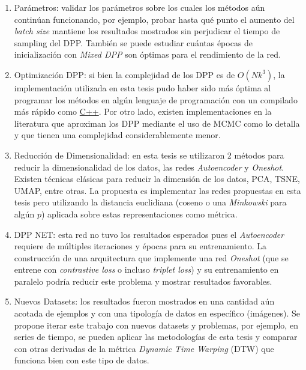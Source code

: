 \begin{enumerate}

    \item Parámetros: validar los parámetros sobre los cuales los métodos aún continúan funcionando, por ejemplo, probar hasta qué punto el aumento del \textit{batch size} mantiene los resultados mostrados sin perjudicar el tiempo de sampling del DPP. También se puede estudiar cuántas épocas de inicialización con \textit{Mixed DPP} son óptimas para el rendimiento de la red. 
    
    \item Optimización DPP: si bien la complejidad de los DPP es de $O(Nk^3)$, la implementación utilizada en esta tesis pudo haber sido más óptima al programar los métodos en algún lenguaje de programación con un compilado más rápido como \href{https://es.wikipedia.org/wiki/C\%2B\%2B}{C++}. Por otro lado, existen implementaciones en la literatura que aproximan los DPP mediante el uso de MCMC como lo detalla \cite{https://doi.org/10.48550/arxiv.1602.05242} y que tienen una complejidad considerablemente menor.
    
    \item Reducción de Dimensionalidad: en esta tesis se utilizaron 2 métodos para reducir la dimensionalidad de los datos, las redes \textit{Autoencoder} y \textit{Oneshot}. Existen técnicas clásicas para reducir la dimensión de los datos, PCA, TSNE, UMAP, entre otras. La propuesta es implementar las redes propuestas en esta tesis pero utilizando la distancia euclidiana (coseno o una \textit{Minkowski} para algún $p$) aplicada sobre estas representaciones como métrica. 
    
    \item DPP NET: esta red no tuvo los resultados esperados pues el \textit{Autoencoder} requiere de múltiples iteraciones y épocas para su entrenamiento. La construcción de una arquitectura que implemente una red \textit{Oneshot} (que se entrene con \textit{contrastive loss} o incluso \textit{triplet loss}) y su entrenamiento en paralelo podría reducir este problema y mostrar resultados favorables. 
    
    \item Nuevos Datasets: los resultados fueron mostrados en una cantidad aún acotada de ejemplos y con una tipología de datos en específico (imágenes). Se propone iterar este trabajo con nuevos datasets y problemas, por ejemplo, en series de tiempo, se pueden aplicar las metodologías de esta tesis y comparar con otras derivadas de la métrica \textit{Dynamic Time Warping} (DTW) que funciona bien con este tipo de datos. 
    

\end{enumerate}
